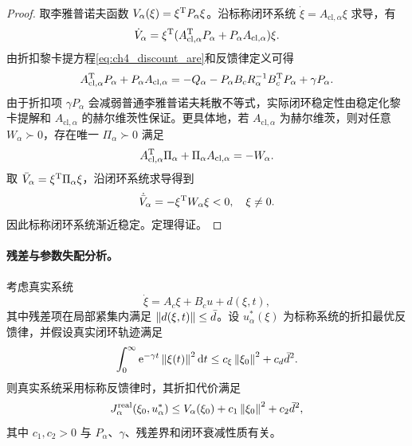 \begin{proof}
取李雅普诺夫函数 $V_\alpha(\xi)=\xi^{\mathrm{T}}P_\alpha\xi$。沿标称闭环系统 $\dot\xi=A_{\mathrm{cl},\alpha}\xi$ 求导，有
\begin{equation}
  \dot V_\alpha=\xi^{\mathrm{T}}(A_{\mathrm{cl},\alpha}^{\mathrm{T}}P_\alpha+P_\alpha A_{\mathrm{cl},\alpha})\xi .
\end{equation}
由折扣黎卡提方程\eqref{eq:ch4_discount_are}和反馈律定义可得
\begin{equation}
  A_{\mathrm{cl},\alpha}^{\mathrm{T}}P_\alpha+P_\alpha A_{\mathrm{cl},\alpha}= -Q_\alpha-P_\alpha B_cR_\alpha^{-1}B_c^{\mathrm{T}}P_\alpha+\gamma P_\alpha .
  \label{eq:ch4_discount_lyap_identity}
\end{equation}
由于折扣项 $\gamma P_\alpha$ 会减弱普通李雅普诺夫耗散不等式，实际闭环稳定性由稳定化黎卡提解和 $A_{\mathrm{cl},\alpha}$ 的赫尔维茨性保证。更具体地，若 $A_{\mathrm{cl},\alpha}$ 为赫尔维茨，则对任意 $W_\alpha\succ0$，存在唯一 $\Pi_\alpha\succ0$ 满足
\begin{equation}
  A_{\mathrm{cl},\alpha}^{\mathrm{T}}\Pi_\alpha+\Pi_\alpha A_{\mathrm{cl},\alpha}=-W_\alpha .
\end{equation}
取 $\bar V_\alpha=\xi^{\mathrm{T}}\Pi_\alpha\xi$，沿闭环系统求导得到
\begin{equation}
  \dot{\bar V}_\alpha=-\xi^{\mathrm{T}}W_\alpha\xi<0,
  \quad \xi\ne0 .
\end{equation}
因此标称闭环系统渐近稳定。定理得证。
\end{proof}

\paragraph{残差与参数失配分析。}
\label{subsec:ch4_residual_theory}

\begin{theorem}[残差项影响下的实际性能上界]
\label{thm:ch4_residual_performance}
考虑真实系统
\begin{equation}
  \dot\xi=A_c\xi+B_cu+d(\xi,t),
  \label{eq:ch4_real_system}
\end{equation}
其中残差项在局部紧集内满足 $\left\lVert d(\xi,t)\right\rVert\le\bar d$。设 $u_\alpha^*(\xi)$ 为标称系统的折扣最优反馈律，并假设真实闭环轨迹满足
\begin{equation}
  \int_0^\infty \mathrm{e}^{-\gamma t}\left\lVert \xi(t)\right\rVert^2\mathrm{d} t\le c_\xi\left\lVert \xi_0\right\rVert^2+c_d\bar d^2 .
  \label{eq:ch4_state_energy_bound}
\end{equation}
则真实系统采用标称反馈律时，其折扣代价满足
\begin{equation}
  J_\alpha^{\mathrm{real}}(\xi_0,u_\alpha^*)\le V_\alpha(\xi_0)+c_1\left\lVert \xi_0\right\rVert^2+c_2\bar d^2,
  \label{eq:ch4_real_cost_bound}
\end{equation}
其中 $c_1,c_2>0$ 与 $P_\alpha$、$\gamma$、残差界和闭环衰减性质有关。
\end{theorem}

